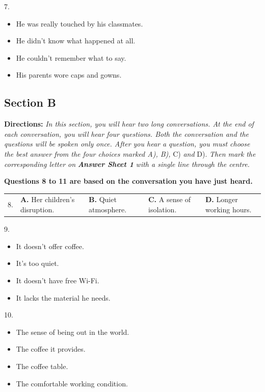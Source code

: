 \documentclass[UTF8,11pt]{ctexart}
\begin{document}
7.


\begin{itemize}[leftmargin=2em,itemsep=.2em,topsep=.4em]\item[A.] He was really touched by his classmates.
\item[B.] He didn't know what happened at all.
\item[C.] He couldn't remember what to say.
\item[D.] His parents wore caps and gowns.
\end{itemize}

\subsection*{\textbf{Section B}}


\textbf{Directions: }\textit{In this section, you will hear two long conversations. At the end of each conversation, you will} \textit{hear four questions. Both the conversation and the questions will be spoken only once. After you hear a} \textit{question, you must choose the best answer from the four choices marked A), B), }C) \textit{and }D). \textit{Then mark} \textit{the corresponding letter on }\textbf{\textit{Answer Sheet 1 }}\textit{with a single line through the centre.}


\textbf{Questions 8 to 11 are based on the conversation you have just heard.}


\noindent\begin{tabularx}{\linewidth}{@{}lXXXX@{}}8. & \textbf{A.} Her children's disruption. & \textbf{B.} Quiet atmosphere. & \textbf{C.} A sense of isolation. & \textbf{D.} Longer working hours.\\\end{tabularx}\par

9.


\begin{itemize}[leftmargin=2em,itemsep=.2em,topsep=.4em]\item[A.] It doesn't offer coffee.
\item[B.] It's too quiet.
\item[C.] It doesn't have free Wi-Fi.
\item[D.] It lacks the material he needs.
\end{itemize}

10.


\begin{itemize}[leftmargin=2em,itemsep=.2em,topsep=.4em]\item[A.] The sense of being out in the world.
\item[B.] The coffee it provides.
\item[C.] The coffee table.
\item[D.] The comfortable working condition.
\end{itemize}
\end{document}
